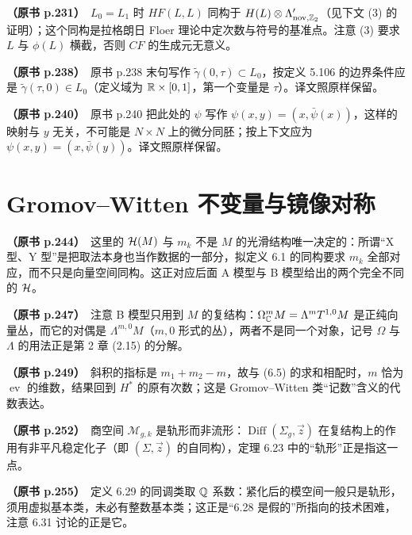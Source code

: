 \noindent \textbf{（原书 p.231）}\ $L_0=L_1$ 时 $HF(L,L)$ 同构于 $H(L)\otimes\Lambda'_{\mathrm{nov},\mathbb{Z}_2}$（见下文 (3) 的证明）；这个同构是拉格朗日 Floer 理论中定次数与符号的基准点。注意 (3) 要求 $L$ 与 $\phi(L)$ 横截，否则 $CF$ 的生成元无意义。\par\smallskip

\noindent \textbf{（原书 p.238）}\ 原书 p.238 末句写作 $\tilde\gamma(0,\tau)\subset L_0$，按定义 5.106 的边界条件应是 $\tilde\gamma(\tau,0)\in L_0$（定义域为 $\mathbb{R}\times[0,1]$，第一个变量是 $\tau$）。译文照原样保留。\par\smallskip

\noindent \textbf{（原书 p.240）}\ 原书 p.240 把此处的 $\psi$ 写作 $\psi(x,y)=(x,\bar\psi(x))$，这样的映射与 $y$ 无关，不可能是 $N\times N$ 上的微分同胚；按上下文应为 $\psi(x,y)=(x,\bar\psi(y))$。译文照原样保留。\par\smallskip

\section*{Gromov–Witten 不变量与镜像对称}

\noindent \textbf{（原书 p.244）}\ 这里的 $\mathcal{H}(M)$ 与 $m_k$ 不是 $M$ 的光滑结构唯一决定的：所谓“X 型、Y 型”是把取法本身也当作数据的一部分，拟定义 6.1 的同构要求 $m_k$ 全部对应，而不只是向量空间同构。这正对应后面 A 模型与 B 模型给出的两个完全不同的 $\mathcal{H}$。\par\smallskip

\noindent \textbf{（原书 p.247）}\ 注意 B 模型只用到 $M$ 的复结构：$\Omega^m_{\mathbb{C}} M=\Lambda^mT^{1,0}M$ 是正纯向量丛，而它的对偶是 $\Lambda^{m,0}M$（$m,0$ 形式的丛），两者不是同一个对象，记号 $\Omega$ 与 $\Lambda$ 的用法正是第 2 章 (2.15) 的分解。\par\smallskip

\noindent \textbf{（原书 p.249）}\ 斜积的指标是 $m_1+m_2-m$，故与 (6.5) 的求和相配时，$m$ 恰为 $\operatorname{ev}$ 的维数，结果回到 $H^*$ 的原有次数；这是 Gromov–Witten 类“记数”含义的代数表达。\par\smallskip

\noindent \textbf{（原书 p.252）}\ 商空间 $\mathcal{M}_{g,k}$ 是轨形而非流形：$\operatorname{Diff}(\Sigma_g,\vec z)$ 在复结构上的作用有非平凡稳定化子（即 $(\Sigma,\vec z)$ 的自同构），定理 6.23 中的“轨形”正是指这一点。\par\smallskip

\noindent \textbf{（原书 p.255）}\ 定义 6.29 的同调类取 $\mathbb{Q}$ 系数：紧化后的模空间一般只是轨形，须用虚拟基本类，未必有整数基本类；这正是“6.28 是假的”所指向的技术困难，注意 6.31 讨论的正是它。\par\smallskip


